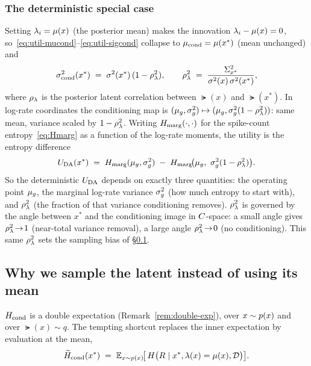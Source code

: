 \subsubsection{The deterministic special case}
\label{subsubsec:det}

Setting $\lambda_i=\mu(x)$ (the posterior mean) makes the innovation
$\lambda_i-\mu(x)=0$, so~\eqref{eq:util-mucond}--\eqref{eq:util-sigcond} collapse
to $\mu_{\mathrm{cond}}=\mu(x^{*})$ (mean unchanged) and
%
\begin{equation}
  \sigma^{2}_{\mathrm{cond}}(x^{*}) \;=\; \sigma^{2}(x^{*})\,(1-\rho_{\lambda}^{2}),
  \qquad
  \rho_{\lambda}^{2} \;=\; \frac{\Sigma_{x^{*}}^{2}}{\sigma^{2}(x)\,\sigma^{2}(x^{*})},
  \label{eq:varreduce}
\end{equation}
%
where $\rho_{\lambda}$ is the posterior latent correlation between $\lat(x)$ and
$\lat(x^{*})$. In log-rate coordinates the conditioning map is
$(\mu_{g},\sigma_{g}^{2})\mapsto(\mu_{g},\sigma_{g}^{2}(1-\rho_{\lambda}^{2}))$: same mean, variance scaled by
$1-\rho_{\lambda}^{2}$. Writing $H_{\mathrm{marg}}(\cdot,\cdot)$ for the spike-count
entropy~\eqref{eq:Hmarg} as a function of the log-rate moments, the utility is the
entropy difference
%
\begin{equation}
  U_{\mathrm{DA}}(x^{*}) \;=\; H_{\mathrm{marg}}(\mu_{g},\sigma_{g}^{2}) \;-\; H_{\mathrm{marg}}\!\big(\mu_{g},\ \sigma_{g}^{2}(1-\rho_{\lambda}^{2})\big).
  \label{eq:da-deterministic}
\end{equation}
%
So the deterministic $U_{\mathrm{DA}}$ depends on exactly three quantities: the operating
point $\mu_{g}$, the marginal log-rate variance $\sigma_{g}^{2}$ (how much entropy to start
with), and $\rho_{\lambda}^{2}$ (the fraction of that variance conditioning removes).
$\rho_{\lambda}^{2}$ is governed by the angle between $x^{*}$ and the conditioning image in
$C$-space: a small angle gives $\rho_{\lambda}^{2}\!\to\!1$ (near-total variance
removal), a large angle $\rho_{\lambda}^{2}\!\to\!0$ (no conditioning). This same $\rho_{\lambda}^{2}$
sets the sampling bias of \S\ref{subsec:why-sample}.

\subsection{Why we sample the latent instead of using its mean}
\label{subsec:why-sample}

$H_{\mathrm{cond}}$ is a double expectation (Remark~\ref{rem:double-exp}), over $x\sim p(x)$ and
over $\lat(x)\sim q$. The tempting shortcut replaces the inner expectation by
evaluation at the mean,
%
\begin{equation}
  \widetilde{H}_{\mathrm{cond}}(x^{*})
  \;=\; \mathbb{E}_{x\sim p(x)}\!\big[\,H\big(R\mid x^{*},\lambda(x)=\mu(x),\mathcal D\big)\big].
  \label{eq:mean-shortcut}
\end{equation}

